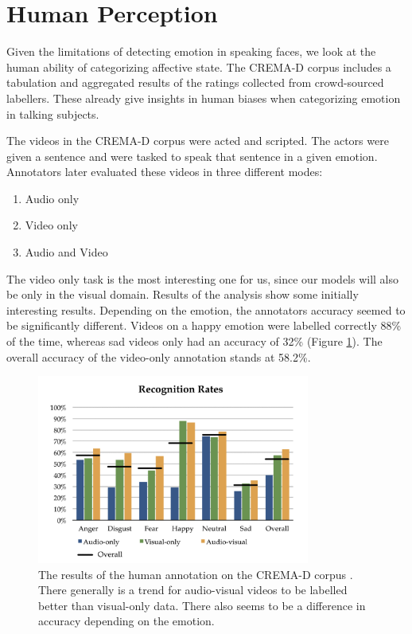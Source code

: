 
\section{Human Perception}
\label{sec:human}
Given the limitations of detecting emotion in speaking faces, we look at the human ability of categorizing affective state. The CREMA-D corpus \cite{cao2014crema} includes a tabulation and aggregated results of the ratings collected from crowd-sourced labellers. These already give insights in human biases when categorizing emotion in talking subjects.

The videos in the CREMA-D corpus were acted and scripted. The actors were given a sentence and were tasked to speak that sentence in a given emotion. Annotators later evaluated these videos in three different modes:

\begin{enumerate}
    \item Audio only
    \item Video only
    \item Audio and Video
\end{enumerate}

The video only task is the most interesting one for us, since our models will also be only in the visual domain. Results of the analysis show some initially interesting results. Depending on the emotion, the annotators accuracy seemed to be significantly different. Videos on a happy emotion were labelled correctly 88\% of the time, whereas sad videos only had an accuracy of 32\% (Figure \ref{fig:crema_results}). The overall accuracy of the video-only annotation stands at 58.2\%.

\begin{figure}
    \centering
    \includegraphics[width=0.8\textwidth]{res/crema.png}
    \caption{The results of the human annotation on the CREMA-D corpus \cite{cao2014crema}. There generally is a trend for audio-visual videos to be labelled better than visual-only data. There also seems to be a difference in accuracy depending on the emotion.}
    \label{fig:crema_results}
\end{figure}

